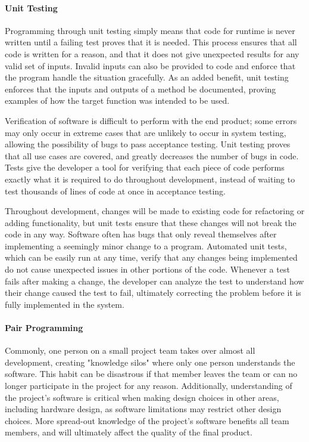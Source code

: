 \paragraph{Unit Testing}
Programming through unit testing simply means that code for runtime is never written until a failing test proves that it is needed.
This process ensures that all code is written for a reason, and that it does not give unexpected results for any valid set of inputs.
Invalid inputs can also be provided to code and enforce that the program handle the situation gracefully. 
As an added benefit, unit testing enforces that the inputs and outputs of a method be documented, proving examples of how the target function was intended to be used. 

Verification of software is difficult to perform with the end product; some errors may only occur in extreme cases that are unlikely to occur in system testing, allowing the possibility of bugs to pass acceptance testing. 
Unit testing proves that all use cases are covered, and greatly decreases the number of bugs in code.
Tests give the developer a tool for verifying that each piece of code performs exactly what it is required to do throughout development, instead of waiting to test thousands of lines of code at once in acceptance testing.

Throughout development, changes will be made to existing code for refactoring or adding functionality, but unit tests ensure that these changes will not break the code in any way. 
Software often has bugs that only reveal themselves after implementing a seemingly minor change to a program.
Automated unit tests, which can be easily run at any time, verify that any changes being implemented do not cause unexpected issues in other portions of the code.
Whenever a test fails after making a change, the developer can analyze the test to understand how their change caused the test to fail, ultimately correcting the problem before it is fully implemented in the system. 
\paragraph{Pair Programming}
Commonly, one person on a small project team takes over almost all development, creating "knowledge silos" where only one person understands the software.
This habit can be disastrous if that member leaves the team or can no longer participate in the project for any reason.
Additionally, understanding of the project's software is critical when making design choices in other areas, including hardware design, as software limitations may restrict other design choices.
More spread-out knowledge of the project's software benefits all team members, and will ultimately affect the quality of the final product.

